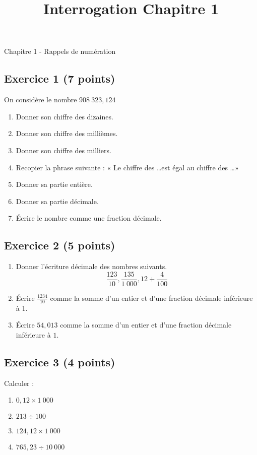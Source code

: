 \documentclass[12 pt]{extarticle}
\title{Interrogation Chapitre 1}
\date{}
\theoremstyle{plain}
\begin{document}
\begin{center}{\Large Chapitre 1 - Rappels de  numération}\\ 
 \end{center}
  
  \subsection*{Exercice 1 (7 points)}
  
  On considère le nombre $908\ 323, 124$
  
  \begin{enumerate}
  \item Donner son chiffre des dizaines. 
  \item Donner son chiffre des millièmes. 
  \item Donner son chiffre des milliers. 
  \item Recopier la phrase suivante : « Le chiffre des \ldots est égal au chiffre des \ldots »
  \item Donner sa partie entière. 
  \item Donner sa partie décimale. 
  \item Écrire le nombre comme une fraction décimale. 
  \end{enumerate}
  
  \subsection*{Exercice 2 (5 points)}
  
  \begin{enumerate}
  \item Donner l'écriture décimale des nombres suivants. 
  \[ \frac{123}{10}, \frac{135}{1\ 000}, 
  12+ \frac{4}{100}\] 
  \item Écrire $\displaystyle\frac{1234}{10}$ comme la somme d'un entier et d'une fraction décimale inférieure à $1$. 
    \item Écrire $54,013$ comme la somme d'un entier et d'une fraction décimale inférieure à $1$. 
  
  \end{enumerate}
  
  \subsection*{Exercice 3 (4 points)}
  
  Calculer : \begin{enumerate}
  \item $0,12 \times 1\ 000$
  \item $213\div 100$
  \item $124,12\times 1\ 000$ 
  \item $765,23 \div 10\ 000$
  \end{enumerate}
  
\end{document}
